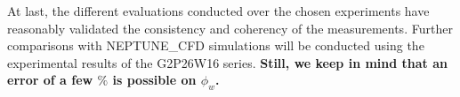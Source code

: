 At last, the different evaluations conducted over the chosen experiments have reasonably validated the consistency and coherency of the measurements. Further comparisons with NEPTUNE\_CFD simulations will be conducted using the experimental results of the G2P26W16 series. \textbf{ Still, we keep in mind that an error of a few $\%$ is possible on $\phi_{w}$.}